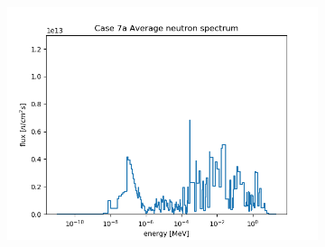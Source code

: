 \documentclass[letterpaper,11pt]{report}
\begin{document}
\begin{figure}[H]
\begin{subfigure}{.32\textwidth}
                \includegraphics[width=\linewidth]{../../phase1a/case7a/analysis_output/p1a_7a_f.png}
                \caption{}
              \end{subfigure}
            \caption{}
            \label{fig:test}
            \end{figure}
\end{document}
